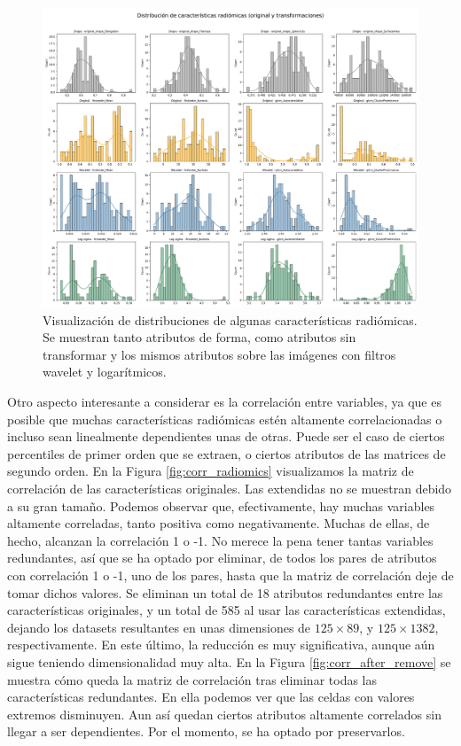 \begin{figure}[!htbp]
\includegraphics[width=\textwidth]{img/distribucion_features_radiomics.pdf}
\caption{Visualización de distribuciones de algunas características radiómicas. Se muestran tanto atributos de forma, como atributos sin transformar y los mismos atributos sobre las imágenes con filtros wavelet y logarítmicos.}\label{fig:dist_radiomics}
\end{figure}

Otro aspecto interesante a considerar es la correlación entre variables, ya que es posible que muchas características radiómicas estén altamente correlacionadas o incluso sean linealmente dependientes unas de otras. Puede ser el caso de ciertos percentiles de primer orden que se extraen, o ciertos atributos de las matrices de segundo orden. En la Figura \ref{fig:corr_radiomics} visualizamos la matriz de correlación de las características originales. Las extendidas no se muestran debido a su gran tamaño. Podemos observar que, efectivamente, hay muchas variables altamente correladas, tanto positiva como negativamente. Muchas de ellas, de hecho, alcanzan la correlación 1 o -1. No merece la pena tener tantas variables redundantes, así que se ha optado por eliminar, de todos los pares de atributos con correlación 1 o -1, uno de los pares, hasta que la matriz de correlación deje de tomar dichos valores. Se eliminan un total de 18 atributos redundantes entre las características originales, y un total de 585 al usar las características extendidas, dejando los datasets resultantes en unas dimensiones de $125 \times 89$, y $125 \times 1382$, respectivamente. En este último, la reducción es muy significativa, aunque aún sigue teniendo dimensionalidad muy alta. En la Figura \ref{fig:corr_after_remove} se muestra cómo queda la matriz de correlación tras eliminar todas las características redundantes. En ella podemos ver que las celdas con valores extremos disminuyen. Aun así quedan ciertos atributos altamente correlados sin llegar a ser dependientes. Por el momento, se ha optado por preservarlos.

